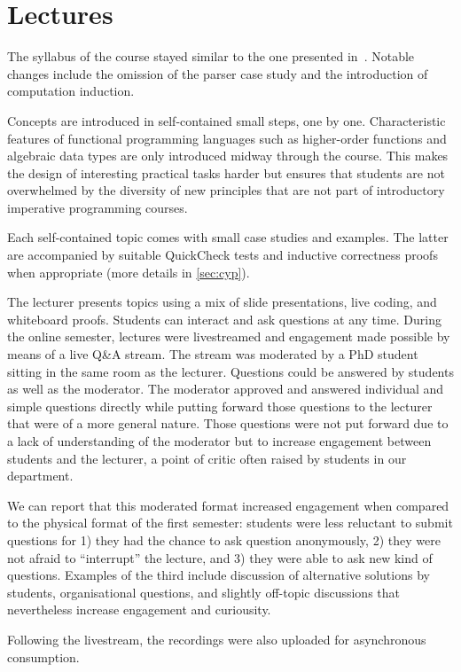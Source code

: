 \section{Lectures}

The syllabus of the course stayed similar to the one presented in~\citep{next_1100}.
Notable changes include the omission of the parser case study
and the introduction of computation induction.

Concepts are introduced in self-contained small steps, one by one.
Characteristic features of functional programming languages such as
higher-order functions and algebraic data types are
only introduced midway through the course.
This makes the design of interesting practical tasks harder
but ensures that students are not overwhelmed by the diversity
of new principles that are not part of introductory imperative programming courses.

Each self-contained topic comes with small case studies and examples.
The latter are accompanied by suitable QuickCheck tests
and inductive correctness proofs when appropriate (more details in \cref{sec:cyp}).

The lecturer presents topics using a mix of
slide presentations,
live coding, and whiteboard proofs.
Students can interact and ask questions at any time.
During the online semester,
lectures were livestreamed and
engagement made possible by means of a live Q\&A stream.
The stream was moderated by a PhD student
sitting in the same room as the lecturer.
Questions could be answered by students as well as the moderator.
The moderator approved and answered individual and simple questions directly while putting forward those questions to the lecturer
that were of a more general nature.
Those questions were not put forward due to a lack of understanding of the moderator
but to increase engagement between students and the lecturer,
a point of critic often raised by students in our department.

We can report that this moderated format increased engagement when compared to the physical format of the first semester:
students were less reluctant to submit questions for
1) they had the chance to ask question anonymously,
2) they were not afraid to ``interrupt'' the lecture, and
3) they were able to ask new kind of questions.
Examples of the third include discussion of alternative solutions by students,
organisational questions,
and slightly off-topic discussions that nevertheless increase engagement and curiousity.

Following the livestream,
the recordings were also uploaded for asynchronous consumption.

